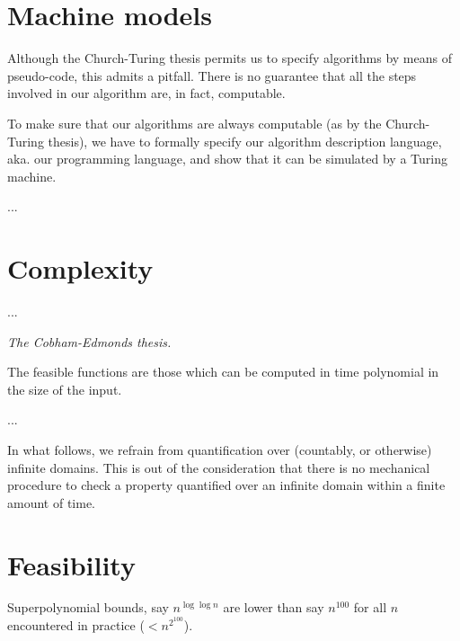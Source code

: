 \section{Machine models}

Although the Church-Turing thesis permits us to specify algorithms by means of
pseudo-code, this admits a pitfall. There is no guarantee that all the steps
involved in our algorithm are, in fact, computable.

To make sure that our algorithms are always computable (as by the Church-Turing
thesis), we have to formally specify our algorithm description language, aka.
our programming language, and show that it can be simulated by a Turing
machine.

...





\section{Complexity}

...

\begin{notion} \emph{The Cobham-Edmonds thesis.}

The feasible functions are those which can be computed in time polynomial in
the size of the input.

\end{notion}

...


In what follows, we refrain from quantification over (countably, or otherwise)
infinite domains. This is out of the consideration that there is no mechanical
procedure to check a property quantified over an infinite domain within a
finite amount of time.

\section{Feasibility}

Superpolynomial bounds, say $n^{\log{\log{n}}}$ are lower than say $n^{100}$ for all
$n$ encountered in practice ($<n^{2^{100}}$).
